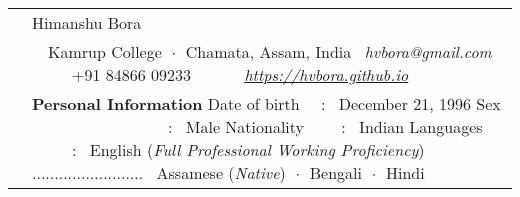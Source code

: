 \documentclass[a4paper, 11pt]{article}
\newenvironment{SectionTable}[1]{
	\renewcommand*{\arraystretch}{1.7}
	\setlength{\tabcolsep}{10pt}
	\begin{longtable}{Rp{5.2in}} & #1 \\}
{\end{longtable}\vspace{-.3cm}}
\begin{document}

\begin{SectionTable}{\Huge \color{Bittersweet} Himanshu Bora}
& 
\faMapMarker \ \ Kamrup College $\;\boldsymbol{\cdot}\;$ Chamata, Assam, India \newline
\faEnvelope \  \textit{hvbora@gmail.com} \ \ \ \  \faPhone \ +91 84866 09233 \ \ \ \ 
\faGlobe \ \ \href{https://hvbora.github.io}{\textit{https://hvbora.github.io}}  \\
		
&
{\textbf {Personal Information}} \newline
Date of birth \ \ : \ December 21, 1996 \newline
Sex \ \ \ \ \ \ \ \ \ \ \ \ \ \ \ \ \ : \ Male \newline
Nationality \ \ \ \ : \ Indian \newline
Languages \ \ \ \ \ : \ English (\textit{Full Professional Working Proficiency}) \newline 
{\color{white} .........................} \ Assamese (\textit{Native}) $\;\boldsymbol{\cdot}\;$ Bengali $\;\boldsymbol{\cdot}\;$ Hindi 
\end{SectionTable}
\end{document}

